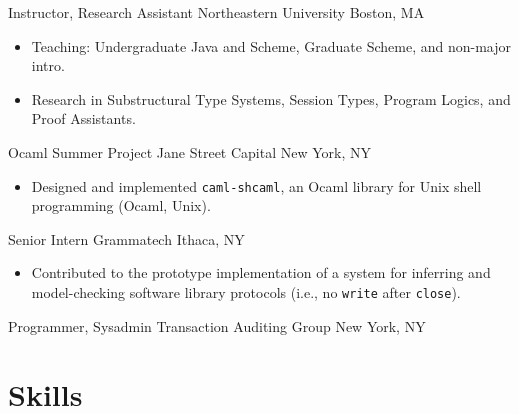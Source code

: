 \documentclass[10pt,letterpaper,sans]{moderncv}
\begin{document}
        {Instructor, Research Assistant}
        {Northeastern University}
        {Boston, MA}
        {}
        {%
          \begin{itemize}
          \item Teaching: Undergraduate Java and Scheme, Graduate Scheme, and non-major intro.
          \item Research in Substructural Type Systems, Session Types, Program Logics, and Proof
            Assistants.
          \end{itemize}
        }

        {Ocaml Summer Project}
        {Jane Street Capital}
        {New York, NY}
        {}
        {%
          \begin{itemize}
          \item Designed and implemented \texttt{caml-shcaml}, an Ocaml library for Unix shell
            programming (Ocaml, Unix).
          \end{itemize}
        }

        {Senior Intern}
        {Grammatech}
        {Ithaca, NY}
        {}
        {%
          \begin{itemize}
          \item Contributed to the prototype implementation of a system for inferring and
            model-checking software library protocols (i.e., no \texttt{write} after
            \texttt{close}).
          \end{itemize}
        }

        {Programmer, Sysadmin}
        {Transaction Auditing Group}
        {New York, NY}
        {}{}



\section{Skills}
\end{document}
